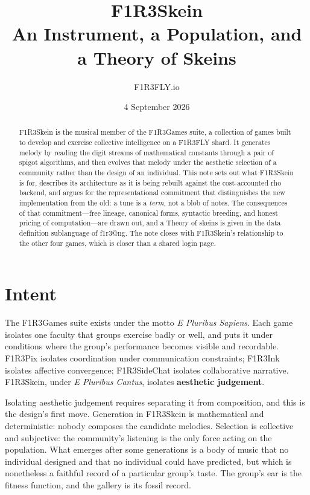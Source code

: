\documentclass[11pt,a4paper]{article}
\title{\textbf{F1R3Skein}\\[0.3em]
\large An Instrument, a Population, and a Theory of Skeins}
\author{F1R3FLY.io}
\date{4 September 2026}
\theoremstyle{definition}
\theoremstyle{plain}
\begin{document}
\maketitle

\begin{abstract}
\noindent
F1R3Skein is the musical member of the F1R3Games suite, a collection of games built to develop and
exercise collective intelligence on a F1R3FLY shard. It generates melody by reading the digit
streams of mathematical constants through a pair of spigot algorithms, and then evolves that melody
under the aesthetic selection of a community rather than the design of an individual. This note
sets out what F1R3Skein is for, describes its architecture as it is being rebuilt against the
cost-accounted rho backend, and argues for the representational commitment that distinguishes the
new implementation from the old: a tune is a \emph{term}, not a blob of notes. The consequences of
that commitment---free lineage, canonical forms, syntactic breeding, and honest pricing of
computation---are drawn out, and a Theory of skeins is given in the data definition sublanguage of
f1r3\textbar{}@ng. The note closes with F1R3Skein's relationship to the other four games, which is
closer than a shared login page.
\end{abstract}

\section{Intent}

The F1R3Games suite exists under the motto \emph{E Pluribus Sapiens}. Each game isolates one
faculty that groups exercise badly or well, and puts it under conditions where the group's
performance becomes visible and recordable. F1R3Pix isolates coordination under communication
constraints; F1R3Ink isolates affective convergence; F1R3SideChat isolates collaborative narrative.
F1R3Skein, under \emph{E Pluribus Cantus}, isolates \textbf{aesthetic judgement}.

Isolating aesthetic judgement requires separating it from composition, and this is the design's
first move. Generation in F1R3Skein is mathematical and deterministic: nobody composes the
candidate melodies. Selection is collective and subjective: the community's listening is the only
force acting on the population. What emerges after some generations is a body of music that no
individual designed and that no individual could have predicted, but which is nonetheless a
faithful record of a particular group's taste. The group's ear is the fitness function, and the
gallery is its fossil record.
\end{document}
